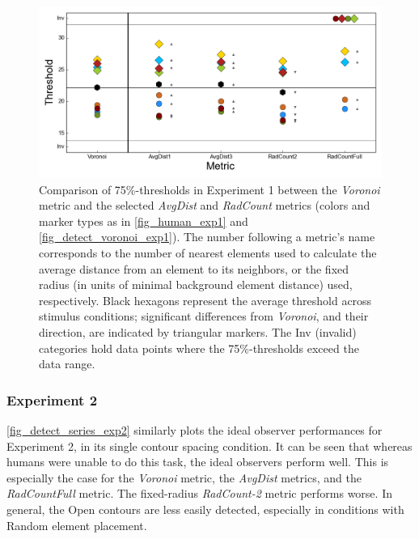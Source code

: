 \documentclass[12pt]{article}
\begin{document}
\begin{figure}[h!t]
\includegraphics{Figures/FIG_detect_series_exp1.png}
\caption{Comparison of 75\%-thresholds in Experiment 1 between the \emph{Voronoi} metric and the selected \emph{AvgDist} and \emph{RadCount} metrics (colors and marker types as in \autoref{fig_human_exp1} and \autoref{fig_detect_voronoi_exp1}). The number following a metric's name corresponds to the number of nearest elements used to calculate the average distance from an element to its neighbors, or the fixed radius (in units of minimal background element distance) used, respectively. Black hexagons represent the average threshold across stimulus conditions; significant differences from \emph{Voronoi}, and their  direction, are indicated by triangular markers. The Inv (invalid) categories hold data points where the 75\%-thresholds exceed the data range.}
\label{fig_detect_series_exp1}
\end{figure}

\subsubsection{Experiment 2}

\autoref{fig_detect_series_exp2} similarly plots the ideal observer performances for Experiment 2, in its single contour spacing condition. It can be seen that whereas humans were unable to do this task, the ideal observers perform well. This is especially the case for the \emph{Voronoi} metric, the \emph{AvgDist} metrics, and the \emph{RadCountFull} metric. The fixed-radius \emph{RadCount-2} metric performs worse. In general, the Open contours are less easily detected, especially in conditions with Random element placement.
\end{document}
